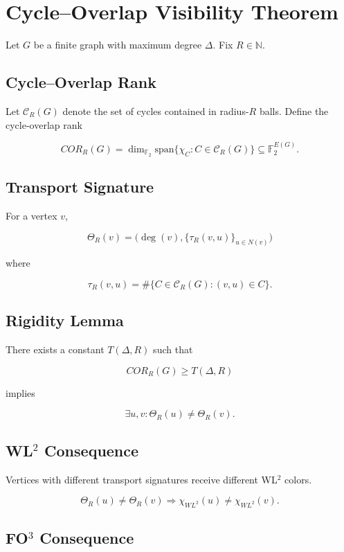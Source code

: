 \section{Cycle--Overlap Visibility Theorem}

Let \(G\) be a finite graph with maximum degree \(\Delta\).
Fix \(R \in \mathbb{N}\).

\subsection{Cycle--Overlap Rank}

Let \(\mathcal{C}_R(G)\) denote the set of cycles contained in radius-\(R\) balls.
Define the cycle-overlap rank

\[
COR_R(G) =
\dim_{\mathbb{F}_2}
\mathrm{span}\{\chi_C : C \in \mathcal{C}_R(G)\}
\subseteq \mathbb{F}_2^{E(G)} .
\]

\subsection{Transport Signature}

For a vertex \(v\),

\[
\Theta_R(v) =
\big(
\deg(v),
\{\tau_R(v,u)\}_{u \in N(v)}
\big)
\]

where

\[
\tau_R(v,u) =
\#\{C \in \mathcal{C}_R(G) : (v,u) \in C\}.
\]

\subsection{Rigidity Lemma}

There exists a constant \(T(\Delta,R)\) such that

\[
COR_R(G) \ge T(\Delta,R)
\]

implies

\[
\exists u,v :
\Theta_R(u) \neq \Theta_R(v).
\]

\subsection{WL\(^2\) Consequence}

Vertices with different transport signatures receive different
WL\(^2\) colors.

\[
\Theta_R(u) \neq \Theta_R(v)
\Rightarrow
\chi_{WL^2}(u) \neq \chi_{WL^2}(v).
\]

\subsection{FO\(^3\) Consequence}

